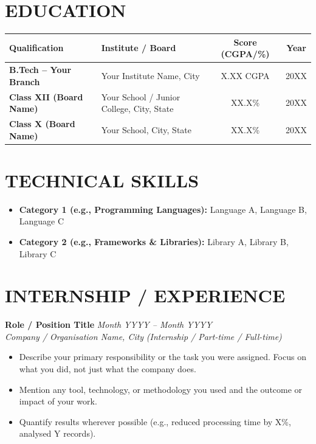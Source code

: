 \documentclass[a4paper,10pt]{article}
\begin{document}
\section{EDUCATION}

\renewcommand{\arraystretch}{1.4}
\begin{tabularx}{\textwidth}{|>{\bfseries}X|X|c|c|}
    \hline
    \textbf{Qualification} & \textbf{Institute / Board} & \textbf{Score (CGPA/\%)} & \textbf{Year} \\
    \hline
    B.Tech -- Your Branch
        & Your Institute Name, City
        & X.XX CGPA & 20XX \\
    \hline
    Class XII (Board Name)
        & Your School / Junior College, City, State
        & XX.X\% & 20XX \\
    \hline
    Class X (Board Name)
        & Your School, City, State
        & XX.X\% & 20XX \\
    \hline
\end{tabularx}

\section{TECHNICAL SKILLS}
\begin{itemize}
    \item \textbf{Category 1 (e.g., Programming Languages):} Language A, Language B, Language C
    \item \textbf{Category 2 (e.g., Frameworks \& Libraries):} Library A, Library B, Library C
\end{itemize}

\section{INTERNSHIP / EXPERIENCE}

\textbf{Role / Position Title} \hfill \textit{Month YYYY -- Month YYYY}\\
\textit{Company / Organisation Name, City} \hfill \textit{(Internship / Part-time / Full-time)}
\begin{itemize}
    \item Describe your primary responsibility or the task you were assigned. Focus on what you did, not just what the company does.
    \item Mention any tool, technology, or methodology you used and the outcome or impact of your work.
    \item Quantify results wherever possible (e.g., reduced processing time by X\%, analysed Y records).
\end{itemize}
\end{document}
